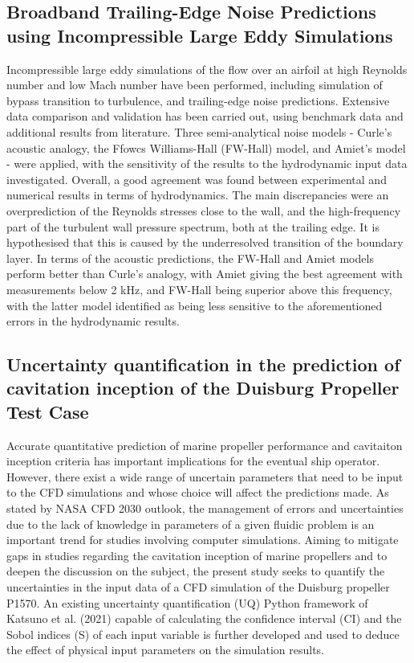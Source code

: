\documentclass[a4paper,10pt]{article}
\begin{document}
\subsection{Broadband Trailing-Edge Noise Predictions using Incompressible Large Eddy Simulations \cite{lloyd_broadband_2022}}

Incompressible large eddy simulations of the flow over an airfoil at high Reynolds number and low Mach number have been performed, including simulation of bypass transition to turbulence, and trailing-edge noise predictions. Extensive data comparison and validation has been carried out, using benchmark data and additional results from literature. Three semi-analytical noise models - Curle's acoustic analogy, the Ffowcs Williams-Hall (FW-Hall) model, and Amiet's model - were applied, with the sensitivity of the results to the hydrodynamic input data investigated. Overall, a good agreement was found between experimental and numerical results in terms of hydrodynamics. The main discrepancies were an overprediction of the Reynolds stresses close to the wall, and the high-frequency part of the turbulent wall pressure spectrum, both at the trailing edge. It is hypothesised that this is caused by the underresolved transition of the boundary layer. In terms of the acoustic predictions, the FW-Hall and Amiet models perform better than Curle’s analogy, with Amiet giving the best agreement with measurements below 2 kHz, and FW-Hall being superior above this frequency, with the latter model identified as being less sensitive to the aforementioned errors in the hydrodynamic results.

\subsection{Uncertainty quantification in the prediction of cavitation inception of the Duisburg Propeller Test Case \cite{scussel_uncertainty_2022}}

Accurate quantitative prediction of marine propeller performance and cavitaiton inception criteria has important implications for the eventual ship operator. However, there exist a wide range of uncertain parameters that need to be input to the CFD simulations and whose choice will affect the predictions made. As stated by NASA CFD 2030 outlook, the management of errors and uncertainties due to the lack of knowledge in parameters of a given fluidic problem is an important trend for studies involving computer simulations. Aiming to mitigate gaps in studies regarding the cavitation inception of marine propellers and to deepen the discussion on the subject, the present study seeks to quantify the uncertainties in the input data of a CFD simulation of the Duisburg propeller P1570. An existing uncertainty quantification (UQ) Python framework of Katsuno et al. (2021) capable of calculating the confidence interval (CI) and the Sobol indices (S) of each input variable is further developed and used to deduce the effect of physical input parameters on the simulation results.
\end{document}
